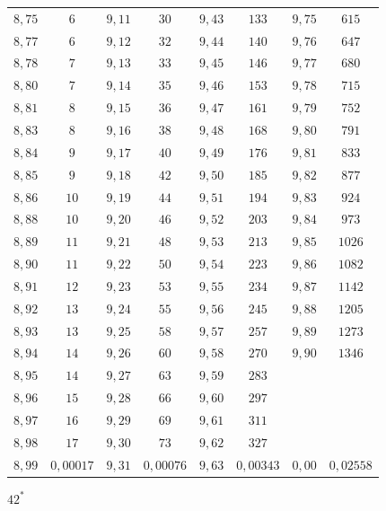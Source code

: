 \documentclass[12pt,a4paper]{article}
\begin{document}
\begin{center}
\begin{longtable}{|c|c|c|c|c|c|c|c|}
$8{,}75$ & $6$ & $9{,}11$ & $30$ & $9{,}43$ & $133$ & $9{,}75$ & $615$ \\
$8{,}77$ & $6$ & $9{,}12$ & $32$ & $9{,}44$ & $140$ & $9{,}76$ & $647$ \\
$8{,}78$ & $7$ & $9{,}13$ & $33$ & $9{,}45$ & $146$ & $9{,}77$ & $680$ \\
$8{,}80$ & $7$ & $9{,}14$ & $35$ & $9{,}46$ & $153$ & $9{,}78$ & $715$ \\
$8{,}81$ & $8$ & $9{,}15$ & $36$ & $9{,}47$ & $161$ & $9{,}79$ & $752$ \\
$8{,}83$ & $8$ & $9{,}16$ & $38$ & $9{,}48$ & $168$ & $9{,}80$ & $791$ \\
$8{,}84$ & $9$ & $9{,}17$ & $40$ & $9{,}49$ & $176$ & $9{,}81$ & $833$ \\
$8{,}85$ & $9$ & $9{,}18$ & $42$ & $9{,}50$ & $185$ & $9{,}82$ & $877$ \\
$8{,}86$ & $10$ & $9{,}19$ & $44$ & $9{,}51$ & $194$ & $9{,}83$ & $924$ \\
$8{,}88$ & $10$ & $9{,}20$ & $46$ & $9{,}52$ & $203$ & $9{,}84$ & $973$ \\
$8{,}89$ & $11$ & $9{,}21$ & $48$ & $9{,}53$ & $213$ & $9{,}85$ & $1026$ \\
$8{,}90$ & $11$ & $9{,}22$ & $50$ & $9{,}54$ & $223$ & $9{,}86$ & $1082$ \\
$8{,}91$ & $12$ & $9{,}23$ & $53$ & $9{,}55$ & $234$ & $9{,}87$ & $1142$ \\
$8{,}92$ & $13$ & $9{,}24$ & $55$ & $9{,}56$ & $245$ & $9{,}88$ & $1205$ \\
$8{,}93$ & $13$ & $9{,}25$ & $58$ & $9{,}57$ & $257$ & $9{,}89$ & $1273$ \\
$8{,}94$ & $14$ & $9{,}26$ & $60$ & $9{,}58$ & $270$ & $9{,}90$ & $1346$ \\
$8{,}95$ & $14$ & $9{,}27$ & $63$ & $9{,}59$ & $283$ & & \\
$8{,}96$ & $15$ & $9{,}28$ & $66$ & $9{,}60$ & $297$ & & \\
$8{,}97$ & $16$ & $9{,}29$ & $69$ & $9{,}61$ & $311$ & & \\
$8{,}98$ & $17$ & $9{,}30$ & $73$ & $9{,}62$ & $327$ & & \\
$8{,}99$ & $0{,}00017$ & $9{,}31$ & $0{,}00076$ & $9{,}63$ & $0{,}00343$ & $0{,}00$ & $0{,}02558$ \\
\hline
\end{longtable}
\end{center}

\begin{flushright}
$42^*$
\end{flushright}
\end{document}
